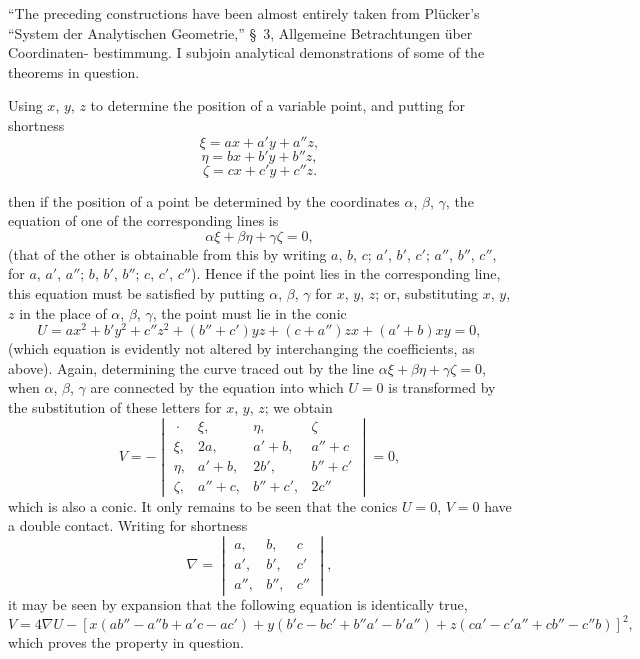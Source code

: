 \documentclass[11pt]{article}
\begin{document}
\medskip

``The preceding constructions have been almost entirely taken from Pl\"ucker's
``System der Analytischen Geometrie,'' \S~3, Allgemeine Betrachtungen \"uber Coordinaten-
bestimmung. I subjoin analytical demonstrations of some of the theorems in question.

\medskip

Using $x$, $y$, $z$ to determine the position of a variable point, and putting for shortness
\[
\xi = ax + a'y + a''z,
\]
\[
\eta = bx + b'y + b''z,
\]
\[
\zeta = cx + c'y + c''z.
\]


then if the position of a point be determined by the coordinates $\alpha$, $\beta$, $\gamma$, the equation
of one of the corresponding lines is
\[
\alpha\xi + \beta\eta + \gamma\zeta = 0,
\]
(that of the other is obtainable from this by writing $a$, $b$, $c$; $a'$, $b'$, $c'$; $a''$, $b''$, $c''$, for
$a$, $a'$, $a''$; $b$, $b'$, $b''$; $c$, $c'$, $c''$). Hence if the point lies in the corresponding line, this
equation must be satisfied by putting $\alpha$, $\beta$, $\gamma$ for $x$, $y$, $z$; or, substituting $x$, $y$, $z$
in the place of $\alpha$, $\beta$, $\gamma$, the point must lie in the conic
\[
U = ax^{2} + b'y^{2} + c''z^{2} + (b'' + c')yz + (c + a'')zx + (a' + b)xy = 0,
\]
(which equation is evidently not altered by interchanging the coefficients, as above).
Again, determining the curve traced out by the line $\alpha\xi + \beta\eta + \gamma\zeta = 0$, when $\alpha$, $\beta$, $\gamma$
are connected by the equation into which $U = 0$ is transformed by the substitution of
these letters for $x$, $y$, $z$; we obtain
\[
V = -\begin{vmatrix} \,\cdot\, & \xi, & \eta, & \zeta \\ \xi, & 2a, & a'+b, & a''+c \\ \eta, & a'+b, & 2b', & b''+c' \\ \zeta, & a''+c, & b''+c', & 2c'' \end{vmatrix} = 0,
\]
which is also a conic. It only remains to be seen that the conics $U = 0$, $V = 0$ have
a double contact. Writing for shortness
\[
\nabla = \begin{vmatrix} a, & b, & c \\ a', & b', & c' \\ a'', & b'', & c'' \end{vmatrix},
\]
it may be seen by expansion that the following equation is identically true,
\[
V = 4\nabla U - [x(ab'' - a''b + a'c - ac') + y(b'c - bc' + b''a' - b'a'') + z(ca' - c'a'' + cb'' - c''b)]^{2},
\]
which proves the property in question.
\end{document}
